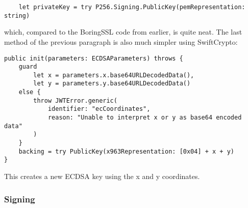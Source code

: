 \begin{verbatim}
    let privateKey = try P256.Signing.PublicKey(pemRepresentation: string)
\end{verbatim}
which, compared to the BoringSSL code from earlier, is quite neat.
The last method of the previous paragraph is also much simpler using SwiftCrypto:
\begin{verbatim}
public init(parameters: ECDSAParameters) throws {
    guard
        let x = parameters.x.base64URLDecodedData(),
        let y = parameters.y.base64URLDecodedData()
    else {
        throw JWTError.generic(
            identifier: "ecCoordinates", 
            reason: "Unable to interpret x or y as base64 encoded data"
        )
    }
    backing = try PublicKey(x963Representation: [0x04] + x + y)
}
\end{verbatim}
This creates a new ECDSA key using the x and y coordinates. \cite{jwtkit}

\subsubsection{Signing}
